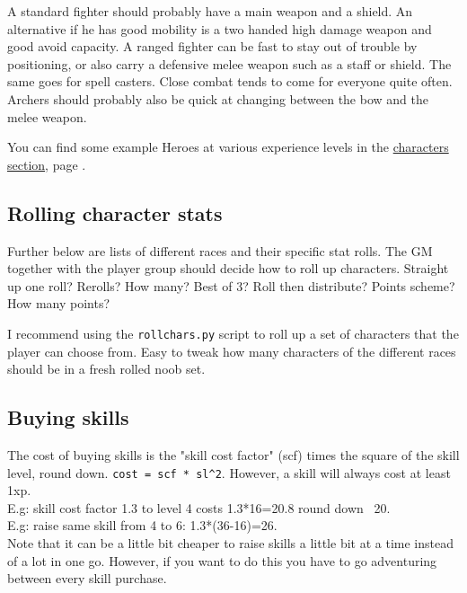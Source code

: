 A standard fighter should probably have a main weapon and a shield. An alternative if he has good mobility is a two handed high damage weapon and good avoid capacity. A ranged fighter can be fast to stay out of trouble by positioning, or also carry a defensive melee weapon such as a staff or shield. The same goes for spell casters. Close combat tends to come for everyone quite often. Archers should probably also be quick at changing between the bow and the melee weapon.

You can find some example Heroes at various experience levels in the \hyperref[cpt:characters]{characters section}, page \pageref{cpt:characters}.


\subsection*{Rolling character stats}
Further below are lists of different races and their specific stat rolls. The GM together with the player group should decide how to roll up characters. Straight up one roll? Rerolls? How many? Best of 3? Roll then distribute? Points scheme? How many points?

I recommend using the \verb|rollchars.py| script to roll up a set of characters that the player can choose from. Easy to tweak how many characters of the different races should be in a fresh rolled noob set.





\subsection*{Buying skills}
The cost of buying skills is the "skill cost factor" (scf) times the square of the skill level, round down. \verb|cost = scf * sl^2|. However, a skill will always cost at least 1xp. \\
E.g: skill cost factor 1.3 to level 4 costs 1.3*16=20.8 round down ~20. \\
E.g: raise same skill from 4 to 6: 1.3*(36-16)=26. \\
Note that it can be a little bit cheaper to raise skills a little bit at a time instead of a lot in one go. However, if you want to do this you have to go adventuring between every skill purchase.

